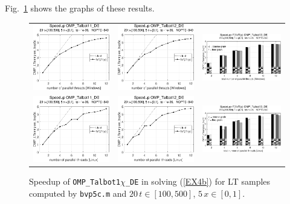 \documentclass[a4paper,10pt]{report}%
\begin{document}
Fig.~\ref{PAR_EX4b_speedup_bvp5c2} shows the graphs of these results.
\begin{figure}[htb]
\centering
\begin{tabular}{ccc} %
\includegraphics[height=0.2\textwidth]{./FIGS/EX4b/EX4b_bvp5c_speedup_11_20t_100_Windows.eps} &
\includegraphics[height=0.2\textwidth]{./FIGS/EX4b/EX4b_bvp5c_speedup_12_20t_100_Windows.eps} &
\includegraphics[height=0.2\textwidth,keepaspectratio=true]{./FIGS/EX4b/EX4b_bvp5c_speedup_13_20t_100_Windows.eps} \\
\includegraphics[height=0.2\textwidth]{./FIGS/EX4b/EX4b_bvp5c_speedup_11_20t_100_Linux.eps} &
\includegraphics[height=0.2\textwidth]{./FIGS/EX4b/EX4b_bvp5c_speedup_12_20t_100_Linux.eps} &
\includegraphics[height=0.2\textwidth,keepaspectratio=true]{./FIGS/EX4b/EX4b_bvp5c_speedup_13_20t_100_Linux.eps}
\end{tabular}
\caption{\small Speedup of {\tt OMP\_Talbot1$\chi$\_DE} in solving (\ref{EX4b}) for LT samples computed
by {\tt bvp5c.m} and $20\,t\in[100,500]$, $5\,x\in[0,1]$.}
\label{PAR_EX4b_speedup_bvp5c2}
\end{figure}
\end{document}
